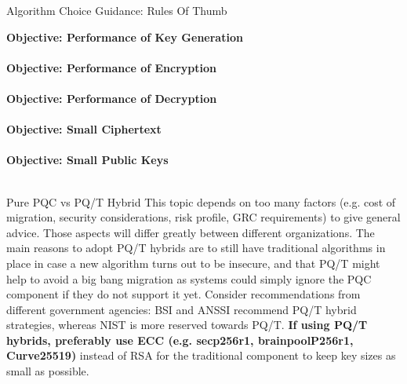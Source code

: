 \begin{minipage}[t]{0.7\textwidth}
\begin{algorithmbox}{Algorithm Choice Guidance: Rules Of Thumb}
\begin{minipage}[t]{0.5\textwidth}
            {\scriptsize \bfseries Objective: Performance of Key Generation \tbv}\\[0.1\baselineskip]
            \\[0.75\baselineskip]
            {\scriptsize \bfseries Objective: Performance of Encryption \tbv}\\[0.1\baselineskip]
            \\[0.75\baselineskip]
            {\scriptsize \bfseries Objective: Performance of Decryption \tbv}\\[0.1\baselineskip]
            \\[0.75\baselineskip]
            {\scriptsize \bfseries Objective: Small Ciphertext \tbv}\\[0.1\baselineskip]
            \\[0.75\baselineskip]
            {\scriptsize \bfseries Objective: Small Public Keys \tbv}\\[0.1\baselineskip]
            \\[0.75\baselineskip]
        \end{minipage}
    \end{algorithmbox}
    \begin{algorithmbox}{Pure PQC vs PQ/T Hybrid}
        \scriptsize
        This topic depends on too many factors (e.g. cost of migration, security considerations, risk profile, GRC requirements) to give general advice. Those aspects will differ greatly between different organizations. The main reasons to adopt PQ/T hybrids are to still have traditional algorithms in place in case a new algorithm turns out to be insecure, and that PQ/T might help to avoid a big bang migration as systems could simply ignore the PQC component if they do not support it yet. Consider recommendations from different government agencies: BSI and ANSSI recommend PQ/T hybrid strategies, whereas NIST is more reserved towards PQ/T. {\bfseries If using PQ/T hybrids, preferably use  ECC (e.g. secp256r1, brainpoolP256r1, Curve25519)} instead of RSA for the traditional component to keep key sizes as small as possible.

\end{algorithmbox}
\end{minipage}
